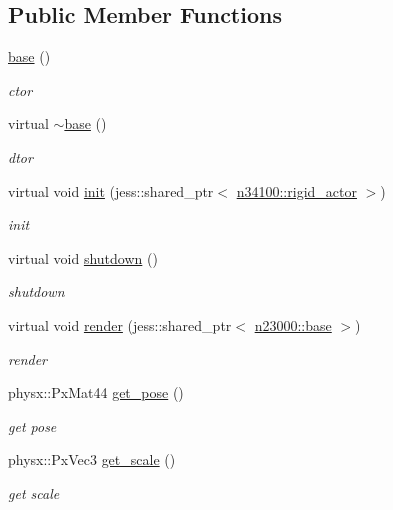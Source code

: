 \subsection*{Public Member Functions}
\begin{DoxyCompactItemize}
\item 
\hyperlink{classnebula_1_1content_1_1shape_1_1admin_1_1base_a78f56855e39ede34e4246147913b102a}{base} ()
\begin{DoxyCompactList}\small\item\em ctor \item\end{DoxyCompactList}\item 
virtual \hyperlink{classnebula_1_1content_1_1shape_1_1admin_1_1base_a74497ec45a44461ce4eca4dc2be477f9}{$\sim$base} ()
\begin{DoxyCompactList}\small\item\em dtor \item\end{DoxyCompactList}\item 
virtual void \hyperlink{classnebula_1_1content_1_1shape_1_1admin_1_1base_ae02304c56a4c72ac3b845e71289f450b}{init} (jess::shared\_\-ptr$<$ \hyperlink{classnebula_1_1content_1_1actor_1_1admin_1_1rigid__actor}{n34100::rigid\_\-actor} $>$)
\begin{DoxyCompactList}\small\item\em init \item\end{DoxyCompactList}\item 
virtual void \hyperlink{classnebula_1_1content_1_1shape_1_1admin_1_1base_a61d6e9d7853ccf10ddd3d05311729f79}{shutdown} ()
\begin{DoxyCompactList}\small\item\em shutdown \item\end{DoxyCompactList}\item 
virtual void \hyperlink{classnebula_1_1content_1_1shape_1_1admin_1_1base_a02bf1999dd948c5e0b8a73136b949f84}{render} (jess::shared\_\-ptr$<$ \hyperlink{classnebula_1_1platform_1_1renderer_1_1base}{n23000::base} $>$)
\begin{DoxyCompactList}\small\item\em render \item\end{DoxyCompactList}\item 
physx::PxMat44 \hyperlink{classnebula_1_1content_1_1shape_1_1admin_1_1base_a140ebc628fcc1ccad7363c866fbd6a4c}{get\_\-pose} ()
\begin{DoxyCompactList}\small\item\em get pose \item\end{DoxyCompactList}\item 
physx::PxVec3 \hyperlink{classnebula_1_1content_1_1shape_1_1admin_1_1base_aa009d3d8d7bf323330031756b1cc090f}{get\_\-scale} ()
\begin{DoxyCompactList}\small\item\em get scale \item\end{DoxyCompactList}\end{DoxyCompactItemize}
